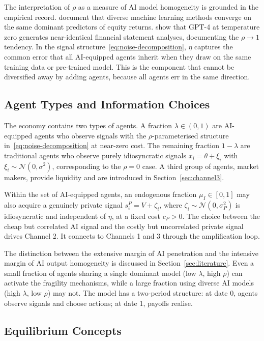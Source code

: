 The interpretation of $\rho$ as a measure of AI model homogeneity is grounded in the empirical record. \citet{gu2020} document that diverse machine learning methods converge on the same dominant predictors of equity returns. \citet{kim2024} show that GPT-4 at temperature zero generates near-identical financial statement analyses, documenting the $\rho \to 1$ tendency. In the signal structure~\eqref{eq:noise-decomposition}, $\eta$ captures the common error that all AI-equipped agents inherit when they draw on the same training data or pre-trained model. This is the component that cannot be diversified away by adding agents, because all agents err in the same direction.

\subsection{Agent Types and Information Choices}
\label{sec:model-agents}

The economy contains two types of agents. A fraction $\lambda \in (0,1)$ are AI-equipped agents who observe signals with the $\rho$-parameterised structure in~\eqref{eq:noise-decomposition} at near-zero cost. The remaining fraction $1-\lambda$ are traditional agents who observe purely idiosyncratic signals $x_i = \theta + \xi_i$ with $\xi_i \sim \mathcal{N}(0,\sigma^2)$, corresponding to the $\rho = 0$ case. A third group of agents, market makers, provide liquidity and are introduced in Section~\ref{sec:channel3}.

Within the set of AI-equipped agents, an endogenous fraction $\mu_I \in [0,1]$ may also acquire a genuinely private signal $s_i^P = V + \zeta_i$, where $\zeta_i \sim \mathcal{N}(0,\sigma_P^2)$ is idiosyncratic and independent of $\eta$, at a fixed cost $c_P > 0$. The choice between the cheap but correlated AI signal and the costly but uncorrelated private signal drives Channel 2. It connects to Channels 1 and 3 through the amplification loop.

The distinction between the extensive margin of AI penetration and the intensive margin of AI output homogeneity is discussed in Section~\ref{sec:literature}. Even a small fraction of agents sharing a single dominant model (low $\lambda$, high $\rho$) can activate the fragility mechanisms, while a large fraction using diverse AI models (high $\lambda$, low $\rho$) may not. The model has a two-period structure: at date 0, agents observe signals and choose actions; at date 1, payoffs realise.

\subsection{Equilibrium Concepts}
\label{sec:model-equil}

